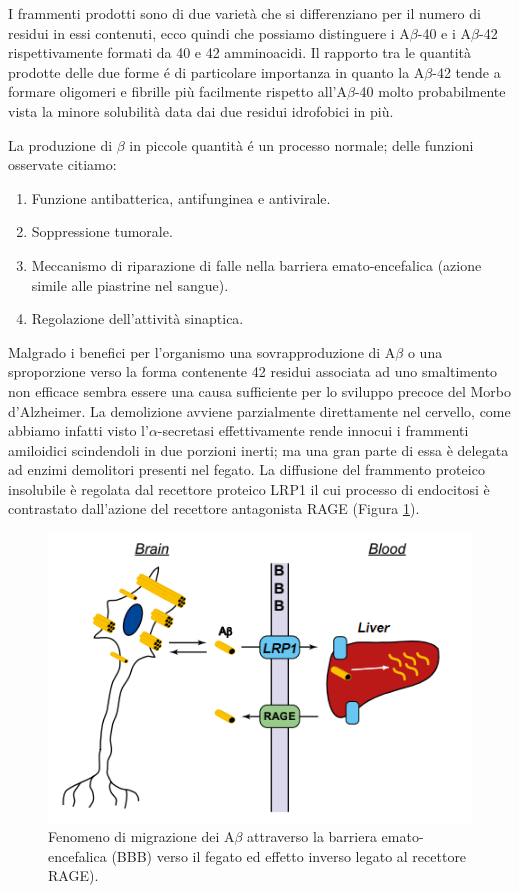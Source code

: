 \documentclass[a4paper, 12pt]{article}
\begin{document}
I frammenti prodotti sono di due varietà che si differenziano per il numero di residui in essi contenuti, ecco quindi che possiamo distinguere i A$\beta$-40 e i A$\beta$-42 rispettivamente formati da 40 e 42 amminoacidi. Il rapporto tra le quantità prodotte delle due forme é di particolare importanza in quanto la A$\beta$-42 tende a formare oligomeri e fibrille più facilmente rispetto all’A$\beta$-40 molto probabilmente vista la minore solubilità data dai due residui idrofobici in più.\cite{kepp_bioinorganic_2012, irvine_protein_2008}

La produzione di $\beta$ in piccole quantità é un processo normale; delle funzioni osservate citiamo: \cite{brothers_physiological_2018}

\begin{enumerate}
	\item Funzione antibatterica, antifunginea e antivirale.
	\item Soppressione tumorale.
	\item Meccanismo di riparazione di falle nella barriera emato-encefalica (azione simile alle piastrine nel sangue).
	\item Regolazione dell'attività sinaptica.
\end{enumerate}

Malgrado i benefici per l'organismo una sovrapproduzione di A$\beta$ o una sproporzione verso la forma contenente 42 residui associata ad uno smaltimento non efficace sembra essere una causa sufficiente per lo sviluppo precoce del Morbo d’Alzheimer. \cite{irvine_protein_2008}
La demolizione avviene parzialmente direttamente nel cervello, come abbiamo infatti visto l'$\alpha$-secretasi effettivamente rende innocui i frammenti amiloidici scindendoli in due porzioni inerti; ma una gran parte di essa è delegata ad enzimi demolitori presenti nel fegato. La diffusione del frammento proteico insolubile è regolata dal recettore proteico LRP1 il cui processo di endocitosi è contrastato dall'azione del recettore antagonista RAGE (Figura \ref{fig:bbb}).\cite{lillis_beyond_2005, dries_extracting_2012}

\begin{figure}[H]
	\centering
	\includegraphics[width=.8\linewidth]{immagini/bbb.png}
	\caption{Fenomeno di migrazione dei A$\beta$ attraverso la barriera emato-encefalica (BBB) verso il fegato ed effetto inverso legato al recettore RAGE).}
	\label{fig:bbb}
\end{figure}
\end{document}
